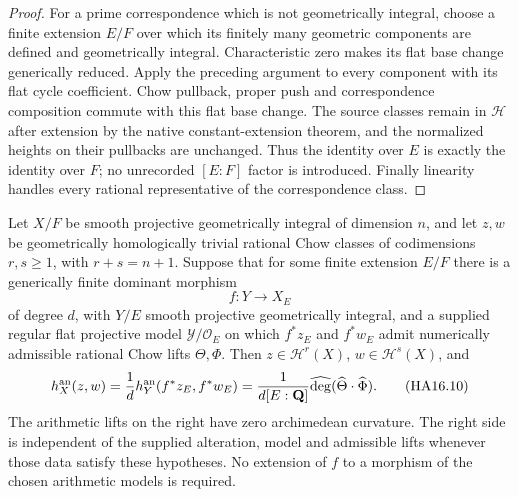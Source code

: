 \begin{proof}
For a prime correspondence which is not geometrically integral,
choose a finite extension $E/F$ over which its finitely many
geometric components are defined and geometrically integral.
Characteristic zero makes its flat base change generically
reduced. Apply the preceding argument to every component with
its flat cycle coefficient. Chow pullback, proper push and
correspondence composition commute with this flat base change.
The source classes remain in $\mathcal H$ after extension by
the native constant-extension theorem, and the normalized
heights on their pullbacks are unchanged. Thus the identity
over $E$ is exactly the identity over $F$; no unrecorded
$[E:F]$ factor is introduced. Finally linearity handles every
rational representative of the correspondence class.
\end{proof}

\begin{corollary}
\label{r16ha:alteration-comparison}
Let $X/F$ be smooth projective geometrically integral of dimension
$n$, and let $z,w$ be geometrically homologically trivial rational
Chow classes of codimensions $r,s\geq1$, with $r+s=n+1$.
Suppose that for some finite extension $E/F$ there is a
generically finite dominant morphism
\[
                      f:Y\longrightarrow X_E
\]
of degree $d$, with $Y/E$ smooth projective geometrically integral,
and a supplied regular flat projective model
$\mathcal Y/\mathcal O_E$ on which $f^*z_E$ and $f^*w_E$
admit numerically admissible rational Chow lifts $\Theta,\Phi$.
Then $z\in\mathcal H^r(X)$, $w\in\mathcal H^s(X)$, and
\[
 h_X^{\rm an}(z,w)
       =\frac1d h_Y^{\rm an}(f^*z_E,f^*w_E)
       =\frac1{d[E:\mathbf Q]}
                     \widehat{\deg}(\widehat\Theta\cdot\widehat\Phi).
 \tag{HA16.10}\label{r16ha:alteration-height}
\]
The arithmetic lifts on the right have zero archimedean curvature.
The right side is independent of the supplied alteration, model
and admissible lifts whenever those data satisfy these hypotheses.
No extension of $f$ to a morphism of the chosen arithmetic models
is required.
\end{corollary}

